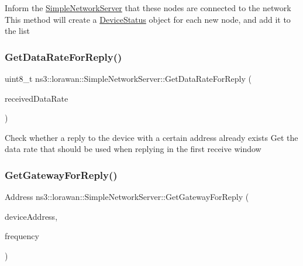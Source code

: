 Inform the \hyperlink{classns3_1_1lorawan_1_1SimpleNetworkServer}{Simple\+Network\+Server} that these nodes are connected to the network This method will create a \hyperlink{classns3_1_1lorawan_1_1DeviceStatus}{Device\+Status} object for each new node, and add it to the list \mbox{\label{classns3_1_1lorawan_1_1SimpleNetworkServer_a900b4cf2a982ada33ea1460421077902}} 
\subsubsection{\texorpdfstring{Get\+Data\+Rate\+For\+Reply()}{GetDataRateForReply()}}
{\footnotesize\ttfamily uint8\+\_\+t ns3\+::lorawan\+::\+Simple\+Network\+Server\+::\+Get\+Data\+Rate\+For\+Reply (\begin{DoxyParamCaption}\item[{uint8\+\_\+t}]{received\+Data\+Rate }\end{DoxyParamCaption})}

Check whether a reply to the device with a certain address already exists Get the data rate that should be used when replying in the first receive window \mbox{\label{classns3_1_1lorawan_1_1SimpleNetworkServer_a40e560ebb7d259465369b50118b72715}} 
\subsubsection{\texorpdfstring{Get\+Gateway\+For\+Reply()}{GetGatewayForReply()}}
{\footnotesize\ttfamily Address ns3\+::lorawan\+::\+Simple\+Network\+Server\+::\+Get\+Gateway\+For\+Reply (\begin{DoxyParamCaption}\item[{\hyperlink{classns3_1_1lorawan_1_1LoraDeviceAddress}{Lora\+Device\+Address}}]{device\+Address,  }\item[{double}]{frequency }\end{DoxyParamCaption})}

